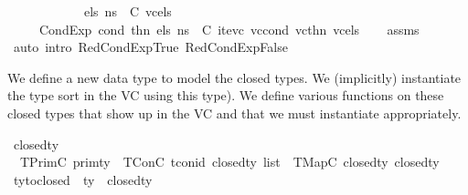 \begin{isabellebody}
\ \ \ \ \ \ \ \ \ \ {\isachardoublequoteopen}{\isasymLambda}{\isacharcomma}{\kern0pt}{\isasymGamma}{\isacharcomma}{\kern0pt}{\isasymOmega}\ {\isasymturnstile}\ {\isasymlangle}els{\isacharcomma}{\kern0pt}\ ns{\isasymrangle}\ {\isasymDown}\ C\ vc{\isacharunderscore}{\kern0pt}els{\isachardoublequoteclose}\isanewline
\ \ \ {\isachardoublequoteopen}{\isasymLambda}{\isacharcomma}{\kern0pt}{\isasymGamma}{\isacharcomma}{\kern0pt}{\isasymOmega}\ {\isasymturnstile}\ {\isasymlangle}CondExp\ cond\ thn\ els{\isacharcomma}{\kern0pt}\ ns{\isasymrangle}\ {\isasymDown}\ C\ {\isacharparenleft}{\kern0pt}ite{\isacharunderscore}{\kern0pt}vc\ vc{\isacharunderscore}{\kern0pt}cond\ vc{\isacharunderscore}{\kern0pt}thn\ vc{\isacharunderscore}{\kern0pt}els{\isacharparenright}{\kern0pt}{\isachardoublequoteclose}\isanewline
%
\isadelimproof
\ \ %
\endisadelimproof
%
\isatagproof
{}\isamarkupfalse%
\ assms\isanewline
\ \ \isamarkupfalse%
\ {\isacharparenleft}{\kern0pt}auto\ intro{\isacharcolon}{\kern0pt}\ RedCondExpTrue\ RedCondExpFalse{\isacharparenright}{\kern0pt}%
\endisatagproof
{\isafoldproof}%
%
\isadelimproof
\isanewline
%
\endisadelimproof
\isanewline
{}\isamarkupfalse%
%
\isadelimdocument
%
\endisadelimdocument
%
\isatagdocument
%
\isamarkuptrue%
%
\endisatagdocument
{\isafolddocument}%
%
\isadelimdocument
%
\endisadelimdocument
%
\begin{isamarkuptext}%
We define a new data type to model the closed types. We (implicitly) instantiate the type sort 
in the VC using this type). We define various functions on these closed types that show up in 
the VC and that we must instantiate appropriately.%
\end{isamarkuptext}\isamarkuptrue%
\isamarkupfalse%
\ closed{\isacharunderscore}{\kern0pt}ty\ {\isacharequal}{\kern0pt}\ \isanewline
\ \ TPrimC\ prim{\isacharunderscore}{\kern0pt}ty\ {\isacharbar}{\kern0pt}\ TConC\ tcon{\isacharunderscore}{\kern0pt}id\ {\isachardoublequoteopen}closed{\isacharunderscore}{\kern0pt}ty\ list{\isachardoublequoteclose}\ {\isacharbar}{\kern0pt}\ TMapC\ closed{\isacharunderscore}{\kern0pt}ty\ closed{\isacharunderscore}{\kern0pt}ty\isanewline
\isanewline
{}\isamarkupfalse%
\ ty{\isacharunderscore}{\kern0pt}to{\isacharunderscore}{\kern0pt}closed\ {\isacharcolon}{\kern0pt}{\isacharcolon}{\kern0pt}\ {\isachardoublequoteopen}ty\ {\isasymRightarrow}\ closed{\isacharunderscore}{\kern0pt}ty{\isachardoublequoteclose}\isanewline
\ \ \ \isanewline

\end{isabellebody}

